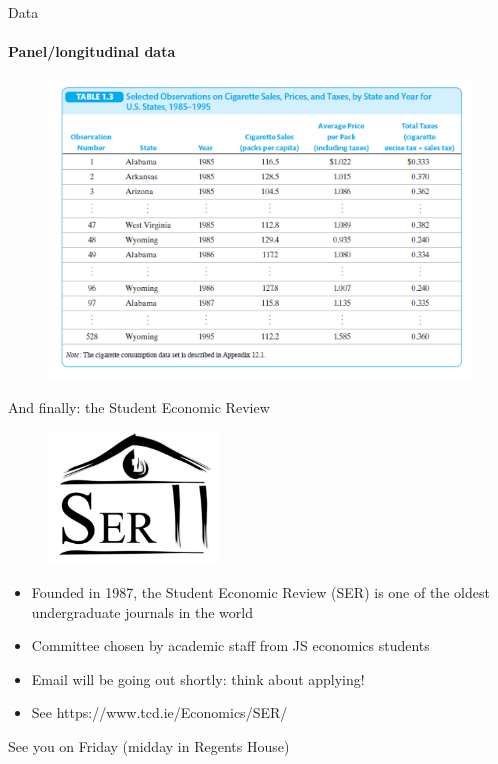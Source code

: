 \documentclass[11pt,english]{beamer}
\begin{document}
\begin{frame}{Data}
	\framesubtitle{Panel/longitudinal data}
		\begin{figure}
			\centering
			\includegraphics[width = 0.9\linewidth]{panel_data.png}
		\end{figure}
	\end{frame}

\begin{frame}{And finally: the Student Economic Review}


	\begin{figure}
		\centering
		\includegraphics[width=0.4\textwidth]{ser_logo.png}
	\end{figure}
	\begin{itemize}
		\item Founded in 1987, the Student Economic Review (SER) is one of the oldest undergraduate journals in the world
		\item Committee chosen by academic staff from JS economics students
		\item Email will be going out shortly: think about applying!
		\item See https://www.tcd.ie/Economics/SER/ 
	\end{itemize}


\end{frame}

\begin{frame}
	\centering
	\Huge{See you on Friday (midday in Regents House)}
\end{frame}
\end{document}
